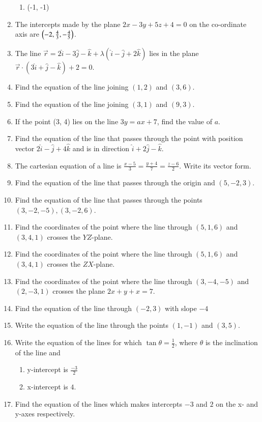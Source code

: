 \begin{enumerate}[label=\thesubsection.\arabic*, ref=\thesubsection.\theenumi]
\begin{enumerate}
\item (-1, -1)
\end{enumerate}
\item The intercepts made by the plane $2x-3y+5z+4=0$ on the co-ordinate axis are $\left(-2, \frac{4}{3}, -\frac{4}{5}\right)$.
\item The line $\overrightarrow{r}=2\hat{i}-3\hat{j}-\hat{k}+\lambda(\hat{i}-\hat{j}+2\hat{k})$ lies in the plane $\overrightarrow{r} \cdot (3\hat{i}+\hat{j}-\hat{k})+2=0$.
\item Find the equation of the line joining $(1, 2)$ and $(3, 6)$.
\item Find the equation of the line joining $(3, 1)$ and $(9, 3)$.
\item If the point (3,  4) lies on the line $3y=ax+7$,  find the value of $a$.
\item  Find the equation of the line that passes through the point with position vector $2\hat{i}-\hat{j}+4\hat{k}$ and is in direction $\hat{i}+2\hat{j}-\hat{k}$.
\item The cartesian equation of a line is $ \frac{x-5}{3}=\frac{y+4}{7}=\frac{z-6}{2}$. Write its vector form.
\item Find the equation of the line that passes through the origin and $(5, -2, 3)$.
\item Find the equation of the line that passes through the points $(3, -2, -5), (3, -2, 6)$.
\item Find the coordinates of the point where the line through $(5,1,6)$ and $(3,4,1)$ crosses the $YZ$-plane.
\item Find the coordinates of the point where the line through $(5,1,6)$ and $(3,4,1)$ crosses the $ZX$-plane.
\item Find the coordinates of the point where the line through $(3,-4,-5)$ and $(2,-3,1)$ crosses the plane $2x+y+x=7$.
\item Find the equation of the line through $(-2,3)$ with slope $-4$
\item Write the equation of the line through the points $(1,-1)$ and $(3,5)$.
\item Write the equation of the lines for which $\tan \theta=\frac{1}{2}$, where $\theta$ is the inclination of the line and
\begin{enumerate}
\item  y-intercept is $\frac{-3}{2}$ 
\item  x-intercept is $4$.
\end{enumerate}
\item Find the equation of the lines which makes intercepts $-3$ and $2$ on the x- and y-axes respectively.

\end{enumerate}
